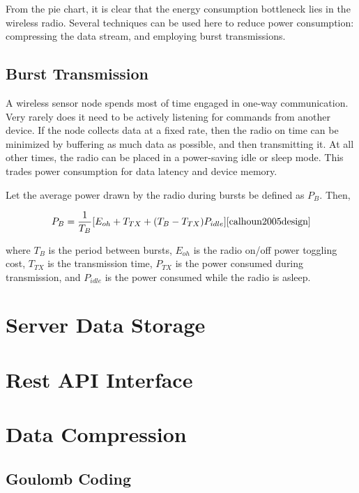 
From the pie chart, it is clear that the energy consumption bottleneck lies in the wireless radio. Several techniques can be used here to reduce power consumption: compressing the data stream, and employing burst transmissions.

\subsection{Burst Transmission}

A wireless sensor node spends most of time engaged in one-way communication. Very rarely does it need to be actively listening for commands from another device. If the node collects data at a fixed rate, then the radio on time can be minimized by buffering as much data as possible, and then transmitting it. At all other times, the radio can be placed in a power-saving idle or sleep mode. This trades power consumption for data latency and device memory.

Let the average power drawn by the radio during bursts be defined as $P_{B}$. Then, 

\begin{equation}
P_{B} = \frac{1}{T_{B}}[E_{oh} + T_{TX} +(T_{B}-T_{TX})P_{idle}]\cite{calhoun2005design}
\end{equation}

where $T_{B}$ is the period between bursts, $E_{oh}$ is the radio on/off power toggling cost, $T_{TX}$ is the transmission time, $P_{TX}$ is the power consumed during transmission, and $P_{idle}$ is the power consumed while the radio is asleep.



 
\section{Server Data Storage}
\section{Rest API Interface}
\section{Data Compression}
\subsection{Goulomb Coding}

